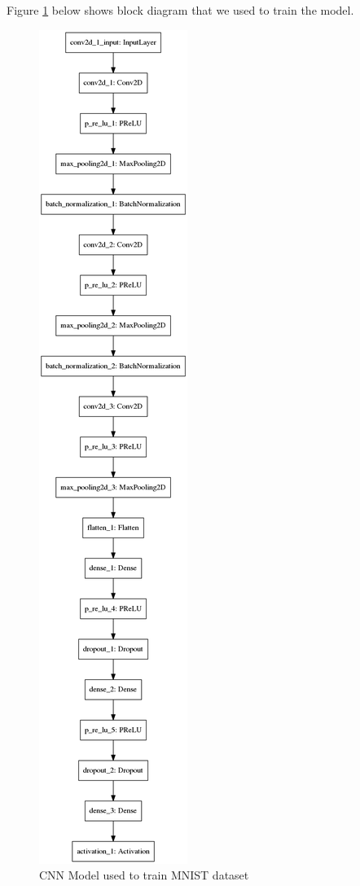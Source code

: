 \documentclass[12pt, letterpaper]{article}
\begin{document}
Figure \ref{model} below shows block diagram that we used to train the 
model. 

\begin{figure}[!h]
	\begin{center}
		\includegraphics[scale = 0.25]{trained_model_diagram.png}
	\end{center}
	
	\caption{CNN Model used to train MNIST dataset} \label{model}
\end{figure}
\newpage
\end{document}
